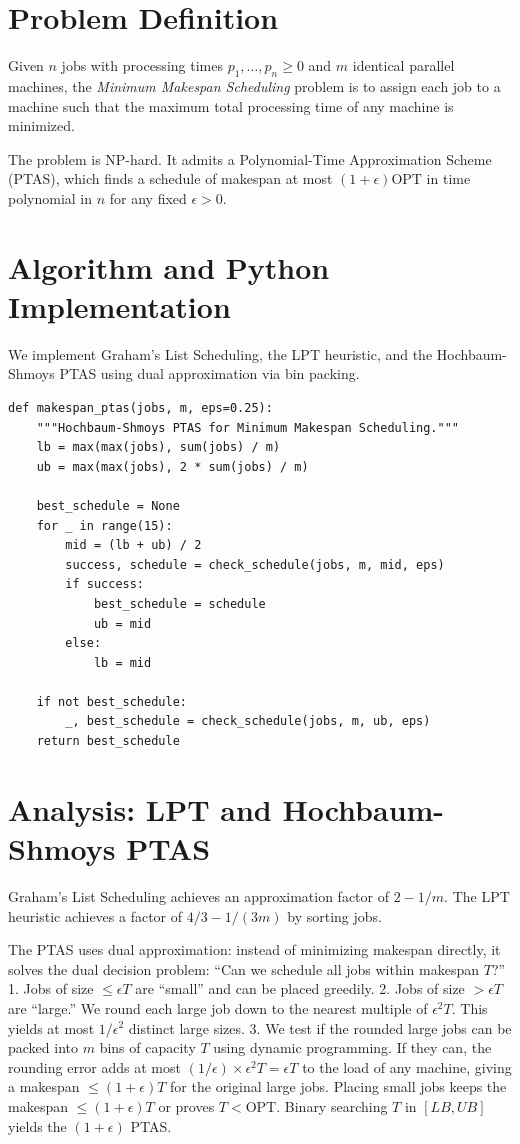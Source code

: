 \documentclass[11pt,oneside]{book}
\begin{document}
\section{Problem Definition}
Given $n$ jobs with processing times $p_1, \dots, p_n \ge 0$ and $m$ identical parallel machines, the \emph{Minimum Makespan Scheduling} problem is to assign each job to a machine such that the maximum total processing time of any machine is minimized.

The problem is NP-hard. It admits a Polynomial-Time Approximation Scheme (PTAS), which finds a schedule of makespan at most $(1 + \epsilon)\text{OPT}$ in time polynomial in $n$ for any fixed $\epsilon > 0$.

\section{Algorithm and Python Implementation}
We implement Graham's List Scheduling, the LPT heuristic, and the Hochbaum-Shmoys PTAS using dual approximation via bin packing.

\begin{lstlisting}[style=python, caption=Hochbaum-Shmoys PTAS for Minimum Makespan]
def makespan_ptas(jobs, m, eps=0.25):
    """Hochbaum-Shmoys PTAS for Minimum Makespan Scheduling."""
    lb = max(max(jobs), sum(jobs) / m)
    ub = max(max(jobs), 2 * sum(jobs) / m)
    
    best_schedule = None
    for _ in range(15):
        mid = (lb + ub) / 2
        success, schedule = check_schedule(jobs, m, mid, eps)
        if success:
            best_schedule = schedule
            ub = mid
        else:
            lb = mid
            
    if not best_schedule:
        _, best_schedule = check_schedule(jobs, m, ub, eps)
    return best_schedule
\end{lstlisting}

\section{Analysis: LPT and Hochbaum-Shmoys PTAS}
Graham's List Scheduling achieves an approximation factor of $2 - 1/m$. The LPT heuristic achieves a factor of $4/3 - 1/(3m)$ by sorting jobs.

The PTAS uses dual approximation: instead of minimizing makespan directly, it solves the dual decision problem: ``Can we schedule all jobs within makespan $T$?''
1.  Jobs of size $\le \epsilon T$ are ``small'' and can be placed greedily.
2.  Jobs of size $> \epsilon T$ are ``large.'' We round each large job down to the nearest multiple of $\epsilon^2 T$. This yields at most $1/\epsilon^2$ distinct large sizes.
3.  We test if the rounded large jobs can be packed into $m$ bins of capacity $T$ using dynamic programming.
If they can, the rounding error adds at most $(1/\epsilon) \times \epsilon^2 T = \epsilon T$ to the load of any machine, giving a makespan $\le (1+\epsilon)T$ for the original large jobs. Placing small jobs keeps the makespan $\le (1+\epsilon)T$ or proves $T < \text{OPT}$. Binary searching $T$ in $[LB, UB]$ yields the $(1+\epsilon)$ PTAS.
\end{document}
